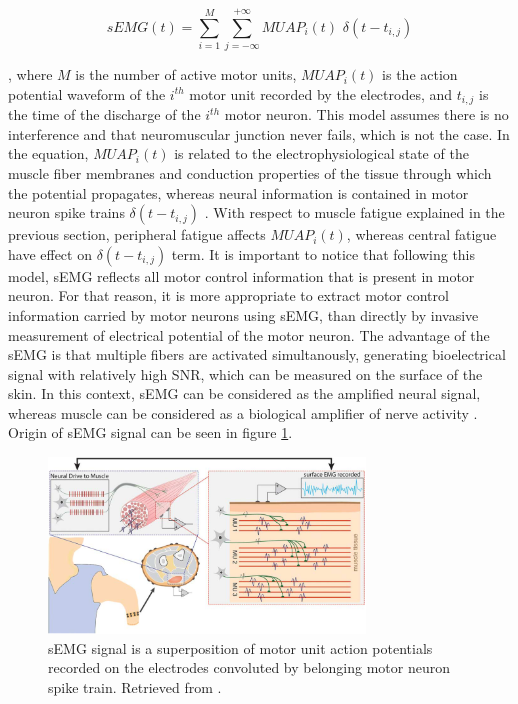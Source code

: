 \begin{equation}
sEMG(t) = \sum_{i=1}^{M} \sum_{j=-\infty}^{+\infty} MUAP_i(t)\,\, \delta(t-t_{i,j})
\end{equation}

, where $M$ is the number of active motor units, $MUAP_i(t)$ is the action potential waveform of the $i^{th}$ motor unit recorded by the electrodes, and $t_{i,j}$ is the time of the discharge of the $i^{th}$ motor neuron. This model assumes there is no interference and that neuromuscular junction never fails, which is not the case. In the equation, $MUAP_i(t)$ is related to the electrophysiological state of the muscle fiber membranes and conduction properties of the tissue through which the potential propagates, whereas neural information is contained in motor neuron spike trains $\delta(t-t_{i,j})$ \citep{Farina2014b}. With respect to muscle fatigue explained in the previous section, peripheral fatigue affects $MUAP_i(t)$, whereas central fatigue have effect on $\delta(t-t_{i,j})$ term. It is important to notice that following this model, sEMG reflects all motor control information that is present in motor neuron. For that reason, it is more appropriate to extract motor control information carried by motor neurons using sEMG, than directly by invasive measurement of electrical potential of the motor neuron. The advantage of the sEMG is that multiple fibers are activated simultanously, generating bioelectrical signal with relatively high SNR, which can be measured on the surface of the skin. In this context, sEMG can be considered as the amplified neural signal, whereas muscle can be considered as a biological amplifier of nerve activity \citep{Farina2014}. Origin of sEMG signal can be seen in figure \ref{fig:EMG_origin}.
\begin{figure}[ht]
\centering
\includegraphics[width=0.75\textwidth]{Images/introduction/EMG_origin.png}
\caption{sEMG signal is a superposition of motor unit action potentials recorded on the electrodes convoluted by belonging motor neuron spike train. Retrieved from \citep{Farina2014}.}
\label{fig:EMG_origin}
\end{figure}

